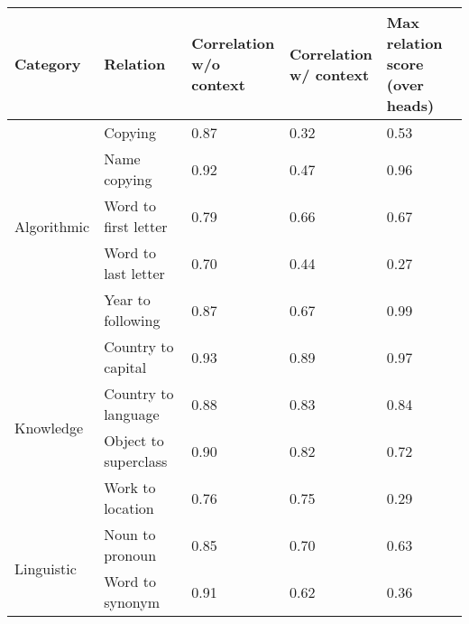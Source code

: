 \begin{tabular}{lllll}
\toprule
Category & Relation & \makecell{Correlation\\w/o context} & \makecell{Correlation\\w/ context} & \makecell{Max relation score\\(over heads)} \\
\midrule
\multirow{5}{*}{Algorithmic} & Copying & 0.87 & 0.32 & 0.53 \\
 & Name copying & 0.92 & 0.47 & 0.96 \\
 & Word to first letter & 0.79 & 0.66 & 0.67 \\
 & Word to last letter & 0.70 & 0.44 & 0.27 \\
 & Year to following & 0.87 & 0.67 & 0.99 \\
\multirow{4}{*}{Knowledge} & Country to capital & 0.93 & 0.89 & 0.97 \\
 & Country to language & 0.88 & 0.83 & 0.84 \\
 & Object to superclass & 0.90 & 0.82 & 0.72 \\
 & Work to location & 0.76 & 0.75 & 0.29 \\
\multirow{2}{*}{Linguistic} & Noun to pronoun & 0.85 & 0.70 & 0.63 \\
 & Word to synonym & 0.91 & 0.62 & 0.36 \\
\bottomrule
\end{tabular}
